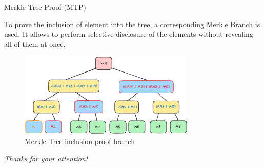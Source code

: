 \documentclass[xcolor={usenames,dvipsnames}]{beamer}
\begin{document}
    \begin{frame}{Merkle Tree Proof (MTP)}

        To prove the inclusion of element into the tree, a corresponding Merkle Branch is used. It allows to perform selective
        disclosure of the elements without revealing all of them at once.

        \begin{figure}
            \centering
            \includegraphics[width=0.75\textwidth]{images/lecture_5/MerkleTreeProof.png}
            \caption{Merkle Tree inclusion proof branch}
        \end{figure}

    \end{frame}
    
	\begin{frame}{}
      \centering \Large
      \emph{Thanks for your attention!}
    \end{frame}
\end{document}
